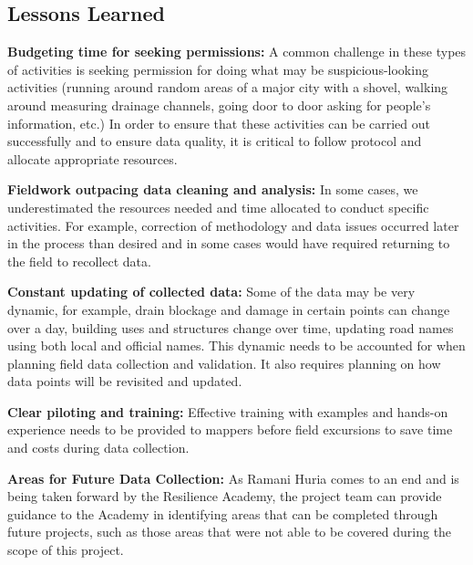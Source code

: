 \documentclass[a4paper,12pt,twoside]{article}
\begin{document}
\subsection{Lessons Learned}
\begin{multicols}{2}
\textbf{Budgeting time for seeking permissions:} A common challenge in these types of activities is seeking permission for doing what may be suspicious-looking activities (running around random areas of a major city with a shovel, walking around measuring drainage channels, going door to door asking for people’s information, etc.) In order to ensure that these activities can be carried out successfully and to ensure data quality, it is critical to follow protocol and allocate appropriate resources.


\textbf{Fieldwork outpacing data cleaning and analysis:} In some cases, we underestimated the resources needed and time allocated to conduct specific activities. For example, correction of methodology and data issues occurred later in the process than desired and in some cases would have required returning to the field to recollect data.   

\textbf{Constant updating of collected data:} Some of the data may be very dynamic, for example, drain blockage and damage in certain points can change over a day, building uses and structures change over time, updating road names using both local and official names. This dynamic needs to be accounted for when planning field data collection and validation. It also requires planning on how data points will be revisited and updated. 

\textbf{Clear piloting and training:} Effective training with examples and hands-on experience needs to be provided to mappers before field excursions to save time and costs during data collection.

\begin{mdframed}[hidealllines=true,backgroundcolor=RHgreen!10,innerleftmargin=6pt,innerrightmargin=6pt,leftmargin=-3pt,rightmargin=-3pt]
\textbf{Areas for Future Data Collection:}
As Ramani Huria comes to an end and is being taken forward by the Resilience Academy, the project team can provide guidance to the Academy in identifying areas that can be completed through future projects, such as those areas that were not able to be covered during the scope of this project.
\end{mdframed}
\end{multicols}
\end{document}
